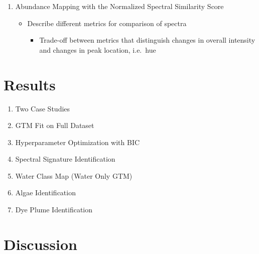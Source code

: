\documentclass[
  letterpaper,
  DIV=11,
  numbers=noendperiod]{scrartcl}
\providecommand{\tightlist}{%
  \setlength{\itemsep}{0pt}\setlength{\parskip}{0pt}}\usepackage{longtable,booktabs,array}
\begin{document}
\begin{enumerate}
\def\labelenumi{\arabic{enumi}.}
\setcounter{enumi}{4}
\tightlist
\item
  Abundance Mapping with the Normalized Spectral Similarity Score

  \begin{itemize}
  \tightlist
  \item
    Describe different metrics for comparison of spectra

    \begin{itemize}
    \tightlist
    \item
      Trade-off between metrics that distinguish changes in overall
      intensity and changes in peak location, i.e.~hue
    \end{itemize}
  \end{itemize}
\end{enumerate}

\section{Results}\label{results}

\begin{enumerate}
\def\labelenumi{\arabic{enumi}.}
\tightlist
\item
  Two Case Studies
\item
  GTM Fit on Full Dataset
\item
  Hyperparameter Optimization with BIC
\item
  Spectral Signature Identification
\item
  Water Class Map (Water Only GTM)
\item
  Algae Identification
\item
  Dye Plume Identification
\end{enumerate}

\section{Discussion}\label{discussion}
\end{document}
